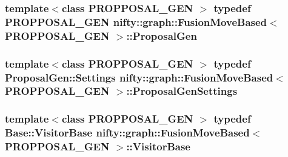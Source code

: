 \subsubsection[{Proposal\+Gen}]{\setlength{\rightskip}{0pt plus 5cm}template$<$class P\+R\+O\+P\+P\+O\+S\+A\+L\+\_\+\+G\+E\+N $>$ typedef P\+R\+O\+P\+P\+O\+S\+A\+L\+\_\+\+G\+E\+N {\bf nifty\+::graph\+::\+Fusion\+Move\+Based}$<$ P\+R\+O\+P\+P\+O\+S\+A\+L\+\_\+\+G\+E\+N $>$\+::{\bf Proposal\+Gen}}\label{classnifty_1_1graph_1_1FusionMoveBased_a65248a923769ebcbad4d92ba2d2f2150}
\hypertarget{classnifty_1_1graph_1_1FusionMoveBased_a397dcfd324df13f658f64519d1072685}{}
\subsubsection[{Proposal\+Gen\+Settings}]{\setlength{\rightskip}{0pt plus 5cm}template$<$class P\+R\+O\+P\+P\+O\+S\+A\+L\+\_\+\+G\+E\+N $>$ typedef Proposal\+Gen\+::\+Settings {\bf nifty\+::graph\+::\+Fusion\+Move\+Based}$<$ P\+R\+O\+P\+P\+O\+S\+A\+L\+\_\+\+G\+E\+N $>$\+::{\bf Proposal\+Gen\+Settings}}\label{classnifty_1_1graph_1_1FusionMoveBased_a397dcfd324df13f658f64519d1072685}
\hypertarget{classnifty_1_1graph_1_1FusionMoveBased_a920e1485e8ab123a4e0ae0773870f4d9}{}
\subsubsection[{Visitor\+Base}]{\setlength{\rightskip}{0pt plus 5cm}template$<$class P\+R\+O\+P\+P\+O\+S\+A\+L\+\_\+\+G\+E\+N $>$ typedef {\bf Base\+::\+Visitor\+Base} {\bf nifty\+::graph\+::\+Fusion\+Move\+Based}$<$ P\+R\+O\+P\+P\+O\+S\+A\+L\+\_\+\+G\+E\+N $>$\+::{\bf Visitor\+Base}}\label{classnifty_1_1graph_1_1FusionMoveBased_a920e1485e8ab123a4e0ae0773870f4d9}
\hypertarget{classnifty_1_1graph_1_1FusionMoveBased_ade5cd053fae62b597daeaab5d830ade2}{}
